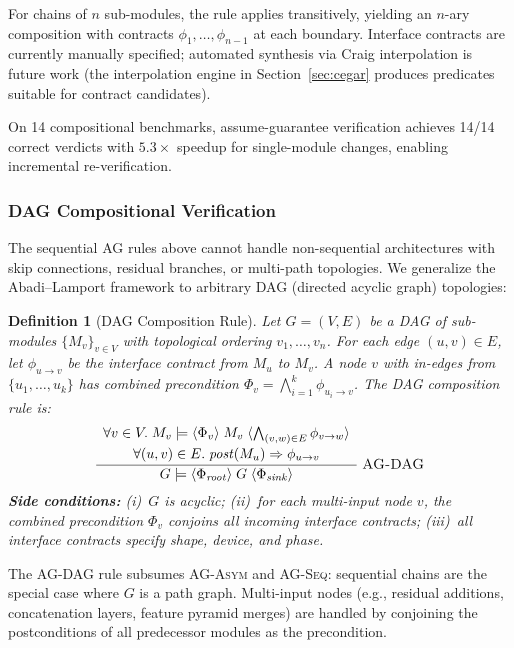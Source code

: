 \documentclass[11pt]{article}
\newtheorem{definition}[theorem]{Definition}
\begin{document}
For chains of $n$ sub-modules, the rule applies transitively,
yielding an $n$-ary composition with contracts
$\phi_1, \ldots, \phi_{n-1}$ at each boundary.
Interface contracts are currently manually specified; automated
synthesis via Craig interpolation is future work (the interpolation
engine in Section~\ref{sec:cegar} produces predicates suitable for
contract candidates).

On 14 compositional benchmarks, assume-guarantee verification achieves
14/14 correct verdicts with $5.3\times$ speedup for single-module
changes, enabling incremental re-verification.

\subsubsection{DAG Compositional Verification}

The sequential AG rules above cannot handle non-sequential
architectures with skip connections, residual branches, or
multi-path topologies.  We generalize the Abadi--Lamport framework
to arbitrary DAG (directed acyclic graph) topologies:

\begin{definition}[DAG Composition Rule]\label{def:ag-dag}
Let $G = (V, E)$ be a DAG of sub-modules $\{M_v\}_{v \in V}$
with topological ordering $v_1, \ldots, v_n$.
For each edge $(u, v) \in E$, let $\phi_{u \to v}$ be the
interface contract from $M_u$ to $M_v$.
A node $v$ with in-edges from $\{u_1, \ldots, u_k\}$ has
\emph{combined precondition}
$\Phi_v = \bigwedge_{i=1}^{k} \phi_{u_i \to v}$.
The DAG composition rule is:
\[
\frac{
  \begin{array}{c}
  \forall v \in V.\;
  M_v \models \langle \Phi_v \rangle\; M_v \;\langle \bigwedge_{(v,w) \in E} \phi_{v \to w} \rangle
  \\[3pt]
  \forall (u,v) \in E.\; \mathit{post}(M_u) \Rightarrow \phi_{u \to v}
  \end{array}
}{
  G \models \langle \Phi_{\mathit{root}} \rangle\; G \;\langle \Phi_{\mathit{sink}} \rangle
}
\;\textsc{AG-DAG}
\]
\textbf{Side conditions:}
(i)~$G$ is acyclic;
(ii)~for each multi-input node $v$, the combined precondition
$\Phi_v$ conjoins all incoming interface contracts;
(iii)~all interface contracts specify shape, device, and phase.
\end{definition}

The \textsc{AG-DAG} rule subsumes \textsc{AG-Asym} and \textsc{AG-Seq}:
sequential chains are the special case where $G$ is a path graph.
Multi-input nodes (e.g., residual additions, concatenation layers,
feature pyramid merges) are handled by conjoining the postconditions
of all predecessor modules as the precondition.
\end{document}
